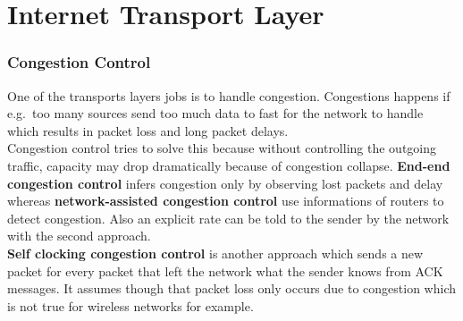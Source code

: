 
\section{Internet Transport Layer}
\subsubsection*{Congestion Control}
One of the transports layers jobs is to handle congestion.
Congestions happens if e.g.\ too many sources send too much data to fast for the network to handle which results in packet loss and long packet delays.\\
Congestion control tries to solve this because without controlling the outgoing traffic, capacity may drop dramatically because of congestion collapse.
\textbf{End-end congestion control} infers congestion only by observing lost packets and delay whereas \textbf{network-assisted congestion control} use informations of routers to detect congestion.
Also an explicit rate can be told to the sender by the network with the second approach.\\

\textbf{Self clocking congestion control} is another approach which sends a new packet for every packet that left the network what the sender knows from ACK messages.
It assumes though that packet loss only occurs due to congestion which is not true for wireless networks for example.
